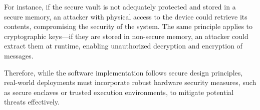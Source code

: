 \documentclass[10pt,twocolumn,letterpaper]{article}
\begin{document}
For instance, if the secure vault is not adequately protected and stored in a secure memory, an attacker with physical access to the device could retrieve its contents, compromising the security of the system. The same principle applies to cryptographic keys—if they are stored in non-secure memory, an attacker could extract them at runtime, enabling unauthorized decryption and encryption of messages.

Therefore, while the software implementation follows secure design principles, real-world deployments must incorporate robust hardware security measures, such as secure enclaves or trusted execution environments, to mitigate potential threats effectively.

{\small
    
    
}
\end{document}
